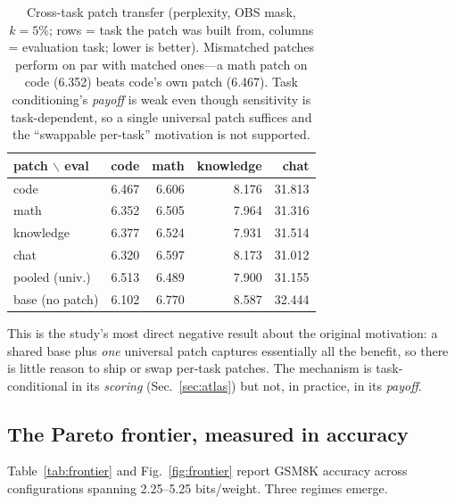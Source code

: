 \documentclass[11pt]{article}
\newcommand{\bpw}{bits/weight}
\begin{document}
\begin{table}[t]
\centering
\caption{Cross-task patch transfer (perplexity, OBS mask, $k{=}5\%$; rows =
task the patch was built from, columns = evaluation task; lower is better).
Mismatched patches perform on par with matched ones---a math patch on code
(6.352) beats code's own patch (6.467). Task conditioning's \emph{payoff} is
weak even though sensitivity is task-dependent, so a single universal patch
suffices and the ``swappable per-task'' motivation is not supported.}
\label{tab:crosstask}
\begin{tabular}{lrrrr}
\toprule
patch $\backslash$ eval & code & math & knowledge & chat \\
\midrule
code            & 6.467 & 6.606 & 8.176 & 31.813 \\
math            & 6.352 & 6.505 & 7.964 & 31.316 \\
knowledge       & 6.377 & 6.524 & 7.931 & 31.514 \\
chat            & 6.320 & 6.597 & 8.173 & 31.012 \\
pooled (univ.)  & 6.513 & 6.489 & 7.900 & 31.155 \\
\midrule
base (no patch) & 6.102 & 6.770 & 8.587 & 32.444 \\
\bottomrule
\end{tabular}
\end{table}

This is the study's most direct negative result about the original motivation:
a shared base plus \emph{one} universal patch captures essentially all the
benefit, so there is little reason to ship or swap per-task patches. The
mechanism is task-conditional in its \emph{scoring} (Sec.~\ref{sec:atlas}) but
not, in practice, in its \emph{payoff}.

\subsection{The Pareto frontier, measured in accuracy}
\label{sec:frontier}
Table~\ref{tab:frontier} and Fig.~\ref{fig:frontier} report GSM8K accuracy
across configurations spanning 2.25--5.25 \bpw{}. Three regimes emerge.
\end{document}
